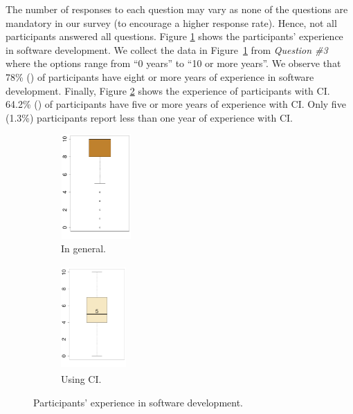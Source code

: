 The number of responses to each question may vary as none of the questions are mandatory in our survey (to encourage a higher response rate). Hence, not all participants answered all questions. 
Figure \ref{fig:developers_experience_in_general} shows the participants' experience in software development. 
We collect the data in Figure~\ref{fig:developers_experience_in_general} from \textit{Question \#3} where the options range from ``0 years'' to ``10 or more years''. We observe that 78\% () of participants have eight or more years of experience in software development. 
Finally, Figure \ref{fig:developers_experience_using_ci} shows the experience of participants with CI. 64.2\% () of participants have five or more years of experience with CI. Only five (1.3\%) participants report less than one year of experience with CI. 

\begin{figure}[H]
	\centering
	\begin{subfigure}[b]{0.3\textwidth}
		\centering
		\includegraphics[width=2.7cm, height=4.0cm]{developer_experience_in_general.pdf}
		\caption{In general.}
		\label{fig:developers_experience_in_general}
	\end{subfigure} %
	\begin{subfigure}[b]{0.3\textwidth}
		\centering
		\includegraphics[width=2.5cm, height=4.0cm]{developer_experience_using_CI.pdf}  
		\caption{Using CI.}
		\label{fig:developers_experience_using_ci}
	\end{subfigure}
	\caption{Participants' experience in software development.}
	\label{fig:developers_experience}
\end{figure}

